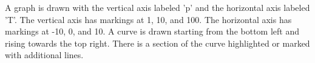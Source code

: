 A graph is drawn with the vertical axis labeled 'p' and the horizontal axis labeled 'T'. The vertical axis has markings at 1, 10, and 100. The horizontal axis has markings at -10, 0, and 10. A curve is drawn starting from the bottom left and rising towards the top right. There is a section of the curve highlighted or marked with additional lines.